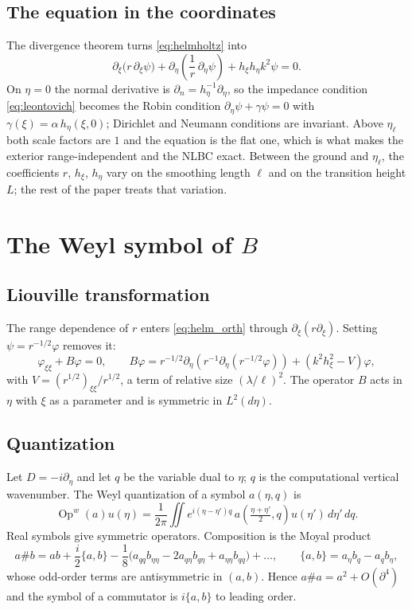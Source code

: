 \documentclass[11pt]{article}
\newcommand{\pd}{\partial}
\newcommand{\Op}{\operatorname{Op}^w}
\newcommand{\etal}{\eta_{\ell}}
\begin{document}
\subsection{The equation in the coordinates}
The divergence theorem turns \eqref{eq:helmholtz} into
\begin{equation}\label{eq:helm_orth}
\pd_\xi\bigl(r\,\pd_\xi\psi\bigr)+\pd_\eta\!\left(\frac1r\,\pd_\eta\psi\right)
+h_\xi h_\eta k^2\psi=0 .
\end{equation}
On $\eta=0$ the normal derivative is $\pd_n=h_\eta^{-1}\pd_\eta$, so the
impedance condition \eqref{eq:leontovich} becomes the Robin condition
$\pd_\eta\psi+\gamma\psi=0$ with $\gamma(\xi)=\alpha\,h_\eta(\xi,0)$; Dirichlet
and Neumann conditions are invariant. Above $\etal$ both scale factors are $1$
and the equation is the flat one, which is what makes the exterior
range-independent and the NLBC exact. Between the ground and $\etal$, the
coefficients $r$, $h_\xi$, $h_\eta$ vary on the smoothing length $\ell$ and on
the transition height $L$; the rest of the paper treats that variation.

\section{The Weyl symbol of $B$}\label{sec:symbol}

\subsection{Liouville transformation}
The range dependence of $r$ enters \eqref{eq:helm_orth} through
$\pd_\xi(r\pd_\xi)$. Setting $\psi=r^{-1/2}\varphi$ removes it:
\begin{equation}\label{eq:liou}
\varphi_{\xi\xi}+B\varphi=0,\qquad
B\varphi=r^{-1/2}\pd_\eta\!\left(r^{-1}\pd_\eta(r^{-1/2}\varphi)\right)
+(k^2h_\xi^2-V)\varphi ,
\end{equation}
with $V=(r^{1/2})_{\xi\xi}/r^{1/2}$, a term of relative size
$(\lambda/\ell)^2$. The operator $B$ acts in $\eta$ with $\xi$ as a parameter
and is symmetric in $L^2(d\eta)$.

\subsection{Quantization}
Let $D=-i\pd_\eta$ and let $q$ be the variable dual to $\eta$; $q$ is the
computational vertical wavenumber. The Weyl quantization of a symbol
$a(\eta,q)$ is
\[
\Op(a)u(\eta)=\frac1{2\pi}\iint e^{i(\eta-\eta')q}\,
a\!\left(\tfrac{\eta+\eta'}2,q\right)u(\eta')\,d\eta'\,dq .
\]
Real symbols give symmetric operators. Composition is the Moyal product
\begin{equation}\label{eq:moyal}
a\#b=ab+\frac i2\{a,b\}
-\frac18\bigl(a_{qq}b_{\eta\eta}-2a_{q\eta}b_{q\eta}+a_{\eta\eta}b_{qq}\bigr)+\dots,
\qquad \{a,b\}=a_\eta b_q-a_qb_\eta ,
\end{equation}
whose odd-order terms are antisymmetric in $(a,b)$. Hence $a\#a=a^2+O(\pd^4)$
and the symbol of a commutator is $i\{a,b\}$ to leading order.
\end{document}
